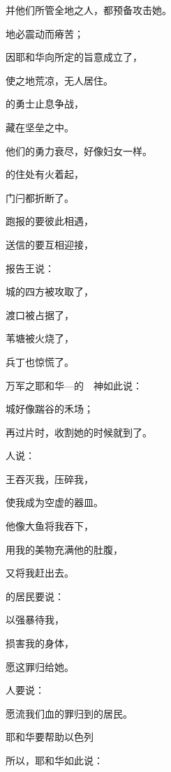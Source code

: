 {\par }{\Q 并他们所管全地之人，都预备攻击她。
\par }{\Q {}地必震动而瘠苦；
\par }{\Q 因耶和华向{}所定的旨意成立了，
\par }{\Q 使{}之地荒凉，无人居住。
\par }{\Q {}的勇士止息争战，
\par }{\Q 藏在坚垒之中。
\par }{\Q 他们的勇力衰尽，好像妇女一样。
\par }{的住处有火着起，
\par }{\Q 门闩都折断了。
\par }{\Q {}跑报的要彼此相遇，
\par }{\Q 送信的要互相迎接，
\par }{\Q 报告{}王说：
\par }{\Q 城的四方被攻取了，
\par }{\Q {}渡口被占据了，
\par }{\Q 苇塘被火烧了，
\par }{\Q 兵丁也惊慌了。
\par }{\PP {}万军之耶和华—{}的　神如此说：
\par }{城好像踹谷的禾场；
\par }{\Q 再过片时，收割她的时候就到了。
\par }{\BB \par }{\Q {}人说：
\par }{王{}吞灭我，压碎我，
\par }{\Q 使我成为空虚的器皿。
\par }{\Q 他像大鱼将我吞下，
\par }{\Q 用我的美物充满他的肚腹，
\par }{\Q 又将我赶出去。
\par }{\Q {}的居民要说：
\par }{以强暴待我，
\par }{\Q 损害我的身体，
\par }{\Q 愿这罪归给她。
\par }{人要说：
\par }{\Q 愿流我们血的罪归到{}的居民。
\par }{\SH 耶和华要帮助以色列
\par }{\Q {}所以，耶和华如此说：
}
